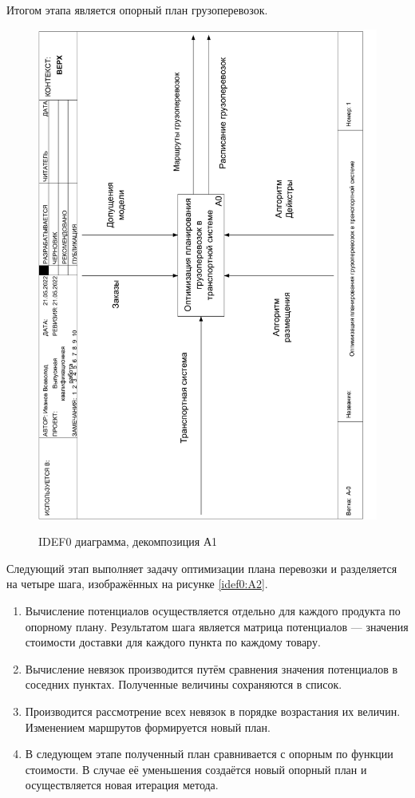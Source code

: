 Итогом этапа является опорный план грузоперевозок.

\pagebreak
\begin{figure}[h]
	\begin{center}
		{\includegraphics[scale=0.63, angle=-90, page=3]{img/idef0.pdf}}
		\caption{IDEF0 диаграмма, декомпозиция А1}
		\label{idef0:A1}
	\end{center}
\end{figure}

Следующий этап выполняет задачу оптимизации плана перевозки и разделяется на четыре шага, изображённых на рисунке \ref{idef0:A2}.
\begin{enumerate}
	\item Вычисление потенциалов осуществляется отдельно для каждого продукта по опорному плану. Результатом шага является матрица потенциалов --- значения стоимости доставки для каждого пункта по каждому товару.
	\item Вычисление невязок производится путём сравнения значения потенциалов в соседних пунктах. Полученные величины сохраняются в список.
	\item Производится рассмотрение всех невязок в порядке возрастания их величин. Изменением маршрутов формируется новый план.
	\item В следующем этапе полученный план сравнивается с опорным по функции стоимости. В случае её уменьшения создаётся новый опорный план и осуществляется новая итерация метода.
\end{enumerate}

